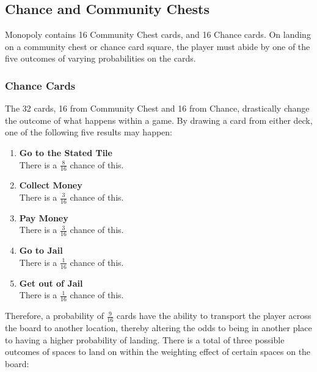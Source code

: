\documentclass[12pt]{article}
\begin{document}
\subsection{Chance and Community Chests}
Monopoly contains 16 Community Chest cards, and 16 Chance cards. On landing on a community chest or chance card square, the player must abide by one of the five outcomes of varying probabilities on the cards.

\subsubsection{Chance Cards}
\label{Chance Card Probabilities}
The 32 cards, 16 from Community Chest and 16 from Chance, drastically change the outcome of what happens within a game. By drawing a card from either deck, one of the following five results may happen:
\begin{enumerate}
  \item \textbf{Go to the Stated Tile} \hfill\\
  There is a $\frac{8}{16}$ chance of this.
  \item \textbf{Collect Money} \hfill\\
  There is a $\frac{3}{16}$ chance of this.
  \item \textbf{Pay Money} \hfill\\
  There is a $\frac{3}{16}$ chance of this.
  \item \textbf{Go to Jail} \hfill\\
  There is a $\frac{1}{16}$ chance of this.
  \item \textbf{Get out of Jail} \hfill\\
  There is a $\frac{1}{16}$ chance of this.
\end{enumerate}
Therefore, a probability of $\frac{9}{16}$ cards have the ability to transport the player across the board to another location, thereby altering the odds to being in another place to having a higher probability of landing. There is a total of three possible outcomes of spaces to land on within the weighting effect of certain spaces on the board:
\end{document}
